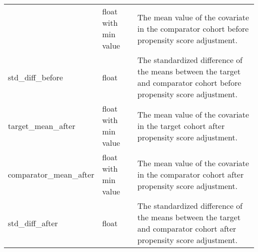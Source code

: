 \documentclass[
]{article}
\begin{document}
\begin{longtable}[]{@{}lll@{}}
\begin{minipage}[t]{0.23\columnwidth}
\end{minipage} & \begin{minipage}[t]{0.18\columnwidth}\raggedright
float with min value\strut
\end{minipage} & \begin{minipage}[t]{0.50\columnwidth}\raggedright
The mean value of the covariate in the comparator cohort before
propensity score adjustment.\strut
\end{minipage}\tabularnewline
\begin{minipage}[t]{0.23\columnwidth}\raggedright
std\_diff\_before\strut
\end{minipage} & \begin{minipage}[t]{0.18\columnwidth}\raggedright
float\strut
\end{minipage} & \begin{minipage}[t]{0.50\columnwidth}\raggedright
The standardized difference of the means between the target and
comparator cohort before propensity score adjustment.\strut
\end{minipage}\tabularnewline
\begin{minipage}[t]{0.23\columnwidth}\raggedright
target\_mean\_after\strut
\end{minipage} & \begin{minipage}[t]{0.18\columnwidth}\raggedright
float with min value\strut
\end{minipage} & \begin{minipage}[t]{0.50\columnwidth}\raggedright
The mean value of the covariate in the target cohort after propensity
score adjustment.\strut
\end{minipage}\tabularnewline
\begin{minipage}[t]{0.23\columnwidth}\raggedright
comparator\_mean\_after\strut
\end{minipage} & \begin{minipage}[t]{0.18\columnwidth}\raggedright
float with min value\strut
\end{minipage} & \begin{minipage}[t]{0.50\columnwidth}\raggedright
The mean value of the covariate in the comparator cohort after
propensity score adjustment.\strut
\end{minipage}\tabularnewline
\begin{minipage}[t]{0.23\columnwidth}\raggedright
std\_diff\_after\strut
\end{minipage} & \begin{minipage}[t]{0.18\columnwidth}\raggedright
float\strut
\end{minipage} & \begin{minipage}[t]{0.50\columnwidth}\raggedright
The standardized difference of the means between the target and
comparator cohort after propensity score adjustment.\strut
\end{minipage}\tabularnewline
\bottomrule
\end{longtable}
\end{document}
